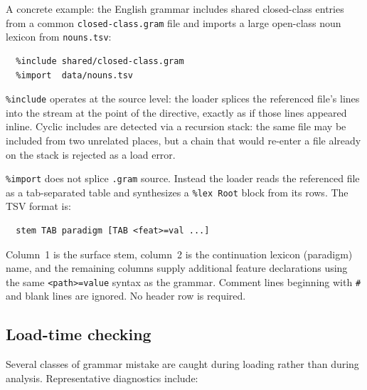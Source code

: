 \documentclass[11pt]{article}
\theoremstyle{definition}
\theoremstyle{plain}
\theoremstyle{remark}
\begin{document}
A concrete example: the English grammar includes shared closed-class entries from a
common \texttt{closed-class.gram} file and imports a large open-class noun lexicon
from \texttt{nouns.tsv}:

\begin{verbatim}
  %include shared/closed-class.gram
  %import  data/nouns.tsv
\end{verbatim}

\texttt{\%include} operates at the source level: the loader splices the referenced file's
lines into the stream at the point of the directive, exactly as if those lines appeared
inline. Cyclic includes are detected via a recursion stack: the same file may be included
from two unrelated places, but a chain that would re-enter a file already on the stack
is rejected as a load error.

\texttt{\%import} does not splice \texttt{.gram} source. Instead the loader reads the
referenced file as a tab-separated table and synthesizes a \texttt{\%lex Root} block from
its rows. The TSV format is:
\begin{verbatim}
  stem TAB paradigm [TAB <feat>=val ...]
\end{verbatim}
Column~1 is the surface stem, column~2 is the continuation lexicon (paradigm) name, and
the remaining columns supply additional feature declarations using the same
\texttt{<path>=value} syntax as the grammar. Comment lines beginning with \texttt{\#} and
blank lines are ignored. No header row is required.

\subsection{Load-time checking}

Several classes of grammar mistake are caught during loading rather than during analysis.
Representative diagnostics include:
\end{document}
